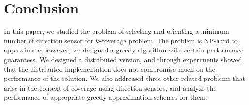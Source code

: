\documentclass[conference]{IEEEtran}
\theoremstyle{definition}
\newtheorem*{NP-Hardness of Approximating the SODkC Problem}{NP-Hardness of Approximating the SODkC Problem}
\newtheorem*{Greedy Algorithm (GA)}{Greedy Algorithm (GA)}
\newtheorem*{GA on the Running Example}{GA on the Running Example}
\newtheorem*{Performance Guarantee of GA}{Performance Guarantee of GA}
\begin{document}
%






\section{Conclusion}
In this paper, we studied the problem of selecting and orienting a minimum number of direction sensor for $k$-coverage problem. The problem is NP-hard to approximate; however, we designed a greedy algorithm with certain performance guarantees. We designed a distributed version, and through experiments showed that the distributed implementation does not compromise much on the performance of the solution. We also addressed three other related problems that arise in the context of coverage using direction sensors, and analyze the performance of appropriate greedy approximation schemes for them.
\end{document}
